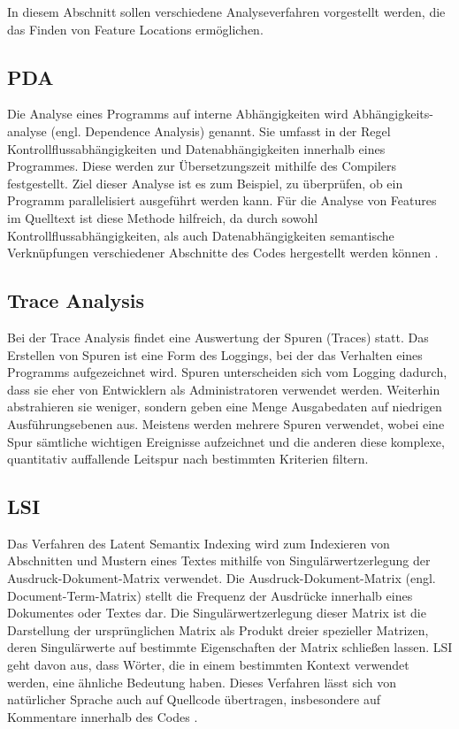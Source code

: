 \documentclass[runningheads,a4paper]{llncs}
\begin{document}
In diesem Abschnitt sollen verschiedene Analyseverfahren vorgestellt werden, die das Finden von Feature Locations ermöglichen.

\subsection*{\ac{PDA}}\label{PDA}

Die Analyse eines Programms auf interne Abhängigkeiten wird Abhängigkeits-analyse (engl. Dependence Analysis) genannt. Sie umfasst in der Regel Kontrollflussabhängigkeiten und Datenabhängigkeiten innerhalb eines Programmes. Diese werden zur Übersetzungszeit mithilfe des Compilers festgestellt. Ziel dieser Analyse ist es zum Beispiel, zu überprüfen, ob ein Programm parallelisiert ausgeführt werden kann. Für die Analyse von Features im Quelltext ist diese Methode hilfreich, da durch sowohl Kontrollflussabhängigkeiten, als auch Datenabhängigkeiten semantische Verknüpfungen verschiedener Abschnitte des Codes hergestellt werden können \cite{PDA}.

\subsection*{Trace Analysis}

Bei der Trace Analysis findet eine Auswertung der Spuren (Traces) statt. Das Erstellen von Spuren ist eine Form des Loggings, bei der das Verhalten eines Programms aufgezeichnet wird. Spuren unterscheiden sich vom Logging dadurch, dass sie eher von Entwicklern als Administratoren verwendet werden. Weiterhin abstrahieren sie weniger, sondern geben eine Menge Ausgabedaten auf niedrigen Ausführungsebenen aus. Meistens werden mehrere Spuren verwendet, wobei eine Spur sämtliche wichtigen Ereignisse aufzeichnet und die anderen diese komplexe, quantitativ auffallende Leitspur nach bestimmten Kriterien filtern.

\subsection*{\ac{LSI}}

Das Verfahren des Latent Semantix Indexing wird zum Indexieren von Abschnitten und Mustern eines Textes mithilfe von Singulärwertzerlegung der Ausdruck-Dokument-Matrix verwendet. Die Ausdruck-Dokument-Matrix (engl. Document-Term-Matrix) stellt die Frequenz der Ausdrücke innerhalb eines Dokumentes oder Textes dar. Die Singulärwertzerlegung dieser Matrix ist die Darstellung der ursprünglichen Matrix als Produkt dreier spezieller Matrizen, deren Singulärwerte auf bestimmte Eigenschaften der Matrix schließen lassen. \ac{LSI} geht davon aus, dass Wörter, die in einem bestimmten Kontext verwendet werden, eine ähnliche Bedeutung haben. Dieses Verfahren lässt sich von natürlicher Sprache auch auf Quellcode übertragen, insbesondere auf Kommentare innerhalb des Codes \cite{LSI}.
\end{document}
